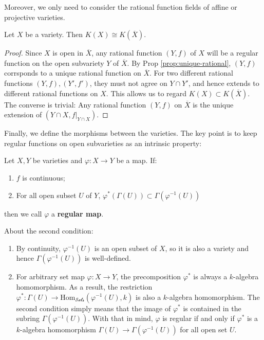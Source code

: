 \documentclass{note-eng}
\begin{document}
Moreover, we only need to consider the rational function fields of affine or projective varieties.

\begin{proposition}\label{prop:field-equal-closure}
    Let $X$ be a variety. Then $K(X) \cong K(\overline{X})$.
\end{proposition}

\begin{proof}
    Since $X$ is open in $\overline{X}$, any rational function $(Y, f)$ of $X$ will be a regular function on the open subvariety $Y$ of $\overline{X}$. By Prop \ref{prop:unique-rational}, $(Y, f)$ corrsponds to a unique rational function on $\overline{X}$. For two different rational functions $(Y, f), (Y', f')$, they must not agree on $Y \cap Y'$, and hence extends to different rational functions on $X$. This allows us to regard $K(X) \subset K(\overline{X})$. The converse is trivial: Any rational function $(Y, f)$ on $\overline{X}$ is the unique extension of $(Y \cap X, f|_{Y \cap X})$.
\end{proof}

Finally, we define the morphisms between the varieties. The key point is to keep regular functions on open subvarieties as an intrinsic property:

\begin{definition}
    Let $X, Y$ be varieties and $\varphi: X \rightarrow Y$ be a map. If:
    \begin{enumerate}
        \item $f$ is continuous;
        \item For all open subset $U$ of $Y$, $\varphi^\ast (\Gamma(U)) \subset \Gamma(\varphi ^{-1}(U))$
    \end{enumerate}
    then we call $\varphi$ a \textbf{regular map}.
\end{definition}

\begin{remark}
    About the second condition:
    \begin{enumerate}
        \item By continuity, $\varphi ^{-1}(U)$ is an open subset of $X$, so it is also a variety and hence $\Gamma(\varphi ^{-1}(U))$ is well-defined.
        \item For arbitrary set map $\varphi: X \rightarrow Y$, the precomposition $\varphi^\ast$ is always a $k$-algebra homomorphism. As a result, the restriction $\varphi^\ast: \Gamma(U) \rightarrow \mathrm{Hom}_{\mathscr{Sets}}(\varphi ^{-1}(U), k)$ is also a $k$-algebra homomorphism. The second condition simply means that the image of $\varphi^\ast$ is contained in the subring $\Gamma(\varphi ^{-1}(U))$. With that in mind, $\varphi$ is regular if and only if $\varphi^\ast$ is a $k$-algebra homomorphism $\Gamma(U) \rightarrow \Gamma(\varphi ^{-1} (U))$ for all open set $U$.
    \end{enumerate}
\end{remark}
\end{document}
